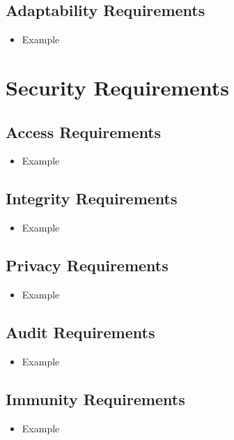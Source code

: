 \documentclass[12pt]{article}
\begin{document}
  \subsection{Adaptability Requirements}
    \begin{itemize}
      \item Example
    \end{itemize}

\section{Security Requirements}
  \subsection{Access Requirements}
    \begin{itemize}
      \item Example
    \end{itemize}

  \subsection{Integrity Requirements}
    \begin{itemize}
      \item Example
    \end{itemize}

  \subsection{Privacy Requirements}
    \begin{itemize}
      \item Example
    \end{itemize}

  \subsection{Audit Requirements}
    \begin{itemize}
      \item Example
    \end{itemize}

  \subsection{Immunity Requirements}
    \begin{itemize}
      \item Example
    \end{itemize}
\end{document}
